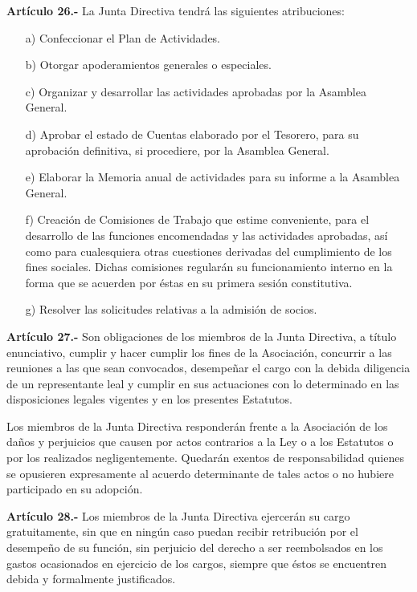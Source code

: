 \documentclass[a4paper,12pt]{article}
\begin{document}
\begin{onehalfspace}
\textbf{Artículo 26.-} La Junta Directiva tendrá las siguientes atribuciones:
\begin{itemize}
\item [a)] Confeccionar el Plan de Actividades.
\item [b)] Otorgar apoderamientos generales o especiales.
\item [c)] Organizar y desarrollar las actividades aprobadas por la Asamblea General.
\item [d)] Aprobar el estado de Cuentas elaborado por el Tesorero, para su aprobación definitiva, si procediere, por la Asamblea General.
\item [e)] Elaborar la Memoria anual de actividades para su informe a la Asamblea General.
\item [f)] Creación de Comisiones de Trabajo que estime conveniente, para el desarrollo de las funciones encomendadas y las actividades aprobadas, así como para cualesquiera otras cuestiones derivadas del cumplimiento de los fines sociales. Dichas comisiones regularán su funcionamiento interno en la forma que se acuerden por éstas en su primera sesión constitutiva.
\item [g)] Resolver las solicitudes relativas a la admisión de socios.
\end{itemize}

\bigskip\bigskip

\textbf{Artículo 27.-} Son obligaciones de los miembros de la Junta Directiva, a título enunciativo, cumplir y hacer cumplir los fines de la Asociación, concurrir a las reuniones a las que sean convocados, desempeñar el cargo con la debida diligencia de un representante leal y cumplir en sus actuaciones con lo determinado en las disposiciones legales vigentes y en los presentes Estatutos.

Los miembros de la Junta Directiva responderán frente a la Asociación de los daños y perjuicios que causen por actos contrarios a la Ley o a los Estatutos o por los realizados negligentemente. Quedarán exentos de responsabilidad quienes se opusieren expresamente al acuerdo determinante de tales actos o no hubiere participado en su adopción.

\bigskip\bigskip

\textbf{Artículo 28.-} Los miembros de la Junta Directiva ejercerán su cargo gratuitamente, sin que en ningún caso puedan recibir retribución por el desempeño de su función, sin perjuicio del derecho a ser reembolsados en los gastos ocasionados en ejercicio de los cargos, siempre que éstos se encuentren debida y formalmente justificados.


\end{onehalfspace}
\end{document}
